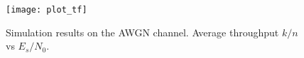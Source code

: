 \documentclass[journal, a4paper]{IEEEtran}
\begin{document}
    \begin{figure}[!hbt]
        \begin{center}
            \texttt{[image: plot\_tf]}
            \caption{Simulation results on the AWGN channel. Average throughput $k/n$ vs $E_s/N_0$.}
            \label{fig:tf_plot}
        \end{center}
    \end{figure}
\end{document}
